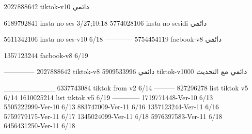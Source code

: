 2027888642 tiktok-v10
دائمي

6189792841 insta no ses
3/27;10:18
5774028106 insta no sesidi
دائمي

5611342106 insta no ses-v10
6/18
------------
5754454119 facbook-v8
دائمي

1357123244 facbook-v8
6/19

--------------
2027888642 tiktok-v8
دائمي
5909533996 tiktok-v1000
دائمي مع التحديث

__________
6337743084 tiktok from v2
6/14
---------
827296278 list tiktok v5
6/14
1610025214 list tiktok v5
6/19
------------
1719771448-Ver-10
6/13
5505222999-Ver-10
6/13
883747009-Ver-11
6/16
1357123244-Ver-11
6/16
5759779175-Ver-11
6/17
1345024099-Ver-11
6/18
5976397583-Ver-11
6/18
6456431250-Ver-11
6/18
